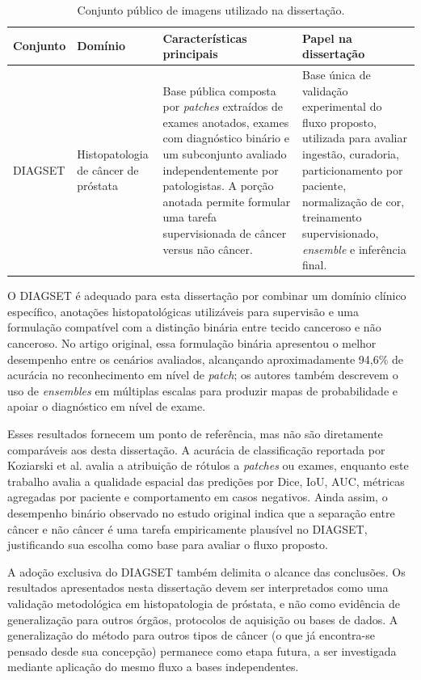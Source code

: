\begin{table}[!htb]
\centering
\caption{Conjunto público de imagens utilizado na dissertação.}
\label{tab:dataset_diagset}
\begin{tabular}{p{2.7cm}p{3.4cm}p{5.2cm}p{4.0cm}}
\toprule
Conjunto & Domínio & Características principais & Papel na dissertação \\
\midrule
DIAGSET &
Histopatologia de câncer de próstata &
Base pública composta por \textit{patches} extraídos de exames anotados, exames com diagnóstico binário e um subconjunto avaliado independentemente por patologistas. A porção anotada permite formular uma tarefa supervisionada de câncer versus não câncer. &
Base única de validação experimental do fluxo proposto, utilizada para avaliar ingestão, curadoria, particionamento por paciente, normalização de cor, treinamento supervisionado, \textit{ensemble} e inferência final. \\
\bottomrule
\end{tabular}
\end{table}

O DIAGSET é adequado para esta dissertação por combinar um domínio clínico específico, anotações histopatológicas utilizáveis para supervisão e uma formulação compatível com a distinção binária entre tecido canceroso e não canceroso. No artigo original, essa formulação binária apresentou o melhor desempenho entre os cenários avaliados, alcançando aproximadamente 94{,}6\% de acurácia no reconhecimento em nível de \textit{patch}; os autores também descrevem o uso de \textit{ensembles} em múltiplas escalas para produzir mapas de probabilidade e apoiar o diagnóstico em nível de exame.

Esses resultados fornecem um ponto de referência, mas não são diretamente comparáveis aos desta dissertação. A acurácia de classificação reportada por Koziarski et al. avalia a atribuição de rótulos a \textit{patches} ou exames, enquanto este trabalho avalia a qualidade espacial das predições por Dice, IoU, AUC, métricas agregadas por paciente e comportamento em casos negativos. Ainda assim, o desempenho binário observado no estudo original indica que a separação entre câncer e não câncer é uma tarefa empiricamente plausível no DIAGSET, justificando sua escolha como base para avaliar o fluxo proposto.

A adoção exclusiva do DIAGSET também delimita o alcance das conclusões. Os resultados apresentados nesta dissertação devem ser interpretados como uma validação metodológica em histopatologia de próstata, e não como evidência de generalização para outros órgãos, protocolos de aquisição ou bases de dados. A generalização do método para outros tipos de câncer (o que já encontra-se pensado desde sua concepção) permanece como etapa futura, a ser investigada mediante aplicação do mesmo fluxo a bases independentes.

